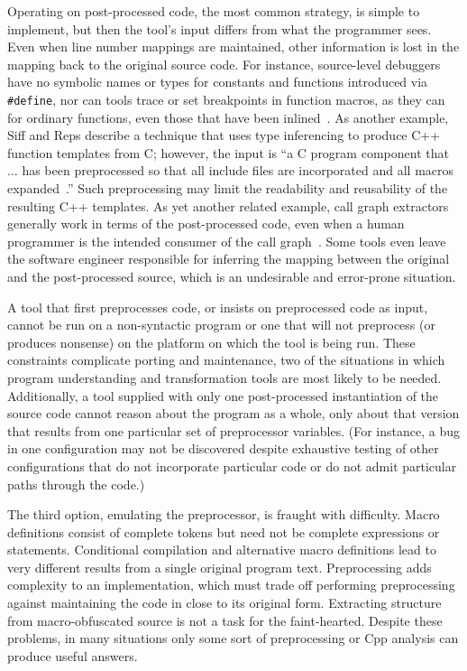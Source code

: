 \documentclass[11pt]{article}
\begin{document}
Operating on post-processed code, the most common strategy, is simple to
implement, but then the tool's input differs from what the
programmer sees.  Even when line number mappings are maintained, other
information is lost in the mapping back to the original source code.
For instance, source-level debuggers have no symbolic names or types
for constants and functions introduced via {\tt \#define}, nor can tools
trace or set breakpoints in function macros, as they can for ordinary
functions, even those that have been inlined~\cite{Zellweger83:TR}.
As another example, Siff
and Reps describe a technique that uses type inferencing to produce
C++ function templates from C; however, the input is ``a C program
component that $\ldots$ has been preprocessed so that all include
files are incorporated and all macros
expanded~\cite[p.~145]{Siff-fse96}.''  Such preprocessing may limit
the readability and reusability of the resulting C++ templates.  As
yet another related example, call graph extractors generally work in
terms of the post-processed code, even when a human programmer is the intended
consumer of the call graph~\cite{Murphy-icse18}.  Some tools even
leave the software engineer responsible for inferring the mapping between the
original and the post-processed source, which is an undesirable and
error-prone situation.

A tool that first preprocesses code, or insists on preprocessed code as
input, cannot be run on a non-syntactic program or one that will not
preprocess (or produces nonsense) on the platform on which the tool is being
run.  These constraints complicate porting and maintenance, two of the
situations in which program understanding and transformation tools are most
likely to be needed.  Additionally, a tool supplied with only one post-processed
instantiation of the source code cannot reason about the program as a
whole, only about that version that results from one particular set of
preprocessor variables.  (For instance, a bug in one configuration may not
be discovered despite exhaustive testing of other configurations that do
not incorporate particular code or do not admit particular paths through
the code.)

The third option, emulating the preprocessor, is fraught with difficulty.
Macro definitions consist of complete tokens but need not be complete
expressions or statements.  Conditional compilation and alternative macro
definitions lead to very different results from a single original program
text.  Preprocessing adds complexity to an implementation, which must trade
off performing preprocessing against maintaining the code in close to its
original form.  Extracting structure from macro-obfuscated source is not a
task for the faint-hearted.  Despite these problems, in many situations
only some sort of preprocessing or Cpp analysis can produce useful answers.
\end{document}
